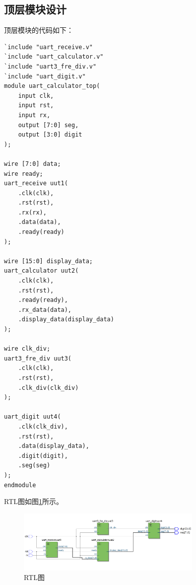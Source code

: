 \documentclass[UTF8]{ctexart}
\begin{document}
\subsection{顶层模块设计}
顶层模块的代码如下：
\begin{framed}
    \begin{lstlisting}[style=verilogStyle]
`include "uart_receive.v"
`include "uart_calculator.v"
`include "uart3_fre_div.v"
`include "uart_digit.v"
module uart_calculator_top(
    input clk,
    input rst,
    input rx,
    output [7:0] seg,
    output [3:0] digit
);

wire [7:0] data;
wire ready;
uart_receive uut1(
    .clk(clk),
    .rst(rst),
    .rx(rx),
    .data(data),
    .ready(ready)
);

wire [15:0] display_data;
uart_calculator uut2(
    .clk(clk),
    .rst(rst),
    .ready(ready),
    .rx_data(data),
    .display_data(display_data)
);

wire clk_div;
uart3_fre_div uut3(
    .clk(clk),
    .rst(rst),
    .clk_div(clk_div)
);

uart_digit uut4(
    .clk(clk_div),
    .rst(rst),
    .data(display_data),
    .digit(digit),
    .seg(seg)
);
endmodule
\end{lstlisting}
\end{framed}
RTL图如图\ref{fig:rtl2}所示。
\begin{figure}[!ht]
    \centering
    \includegraphics[width=0.8\textwidth]{rtl2.png}
    \caption{RTL图}
    \label{fig:rtl2}
\end{figure}
\end{document}
